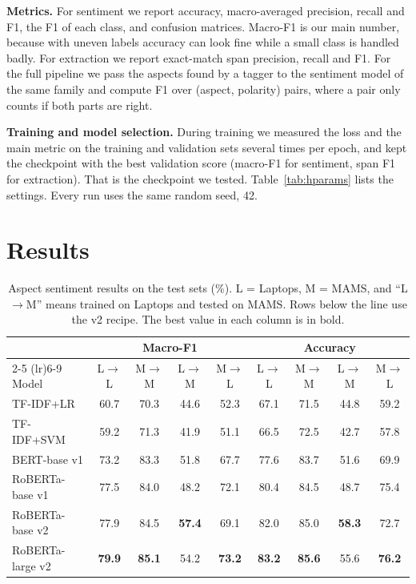 \documentclass[11pt]{article}
\begin{document}
\textbf{Metrics.} For sentiment we report accuracy, macro-averaged precision, recall and F1, the F1 of each class, and confusion matrices. Macro-F1 is our main number, because with uneven labels accuracy can look fine while a small class is handled badly. For extraction we report exact-match span precision, recall and F1. For the full pipeline we pass the aspects found by a tagger to the sentiment model of the same family and compute F1 over (aspect, polarity) pairs, where a pair only counts if both parts are right.

\textbf{Training and model selection.} During training we measured the loss and the main metric on the training and validation sets several times per epoch, and kept the checkpoint with the best validation score (macro-F1 for sentiment, span F1 for extraction). That is the checkpoint we tested. Table~\ref{tab:hparams} lists the settings. Every run uses the same random seed, 42.

\section{Results}
\begin{table}[t]
\centering
\footnotesize
\begin{tabular}{lcccccccc}
\toprule
 & \multicolumn{4}{c}{Macro-F1} & \multicolumn{4}{c}{Accuracy} \\
\cmidrule(lr){2-5} \cmidrule(lr){6-9}
Model & L$\to$L & M$\to$M & L$\to$M & M$\to$L & L$\to$L & M$\to$M & L$\to$M & M$\to$L \\
\midrule
TF-IDF+LR & 60.7 & 70.3 & 44.6 & 52.3 & 67.1 & 71.5 & 44.8 & 59.2 \\
TF-IDF+SVM & 59.2 & 71.3 & 41.9 & 51.1 & 66.5 & 72.5 & 42.7 & 57.8 \\
BERT-base v1 & 73.2 & 83.3 & 51.8 & 67.7 & 77.6 & 83.7 & 51.6 & 69.9 \\
RoBERTa-base v1 & 77.5 & 84.0 & 48.2 & 72.1 & 80.4 & 84.5 & 48.7 & 75.4 \\
\midrule
RoBERTa-base v2 & 77.9 & 84.5 & \textbf{57.4} & 69.1 & 82.0 & 85.0 & \textbf{58.3} & 72.7 \\
RoBERTa-large v2 & \textbf{79.9} & \textbf{85.1} & 54.2 & \textbf{73.2} & \textbf{83.2} & \textbf{85.6} & 55.6 & \textbf{76.2} \\
\bottomrule
\end{tabular}
\caption{Aspect sentiment results on the test sets (\%). L = Laptops, M = MAMS, and ``L$\to$M'' means trained on Laptops and tested on MAMS. Rows below the line use the v2 recipe. The best value in each column is in bold.}
\label{tab:asc}
\end{table}
\end{document}
